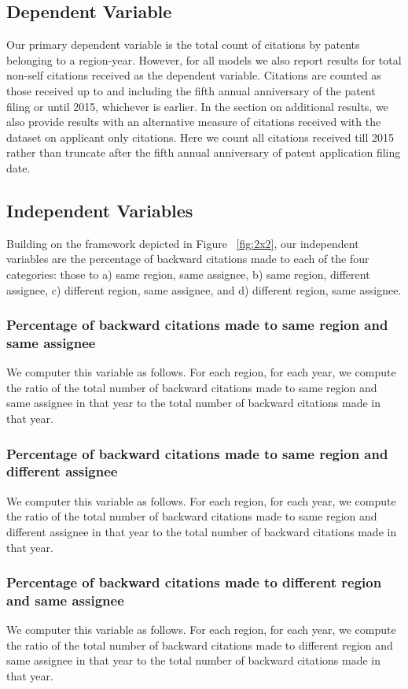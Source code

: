 \documentclass[12pt,letterpaper]{article}
\begin{document}
\subsection{Dependent Variable}
Our primary dependent variable is the  total count of citations by patents belonging to a region-year. However, for all models we also report results for total non-self citations received as the dependent variable. Citations are counted as those received up to and including the fifth annual anniversary of the patent filing or until  2015, whichever is earlier. In the section on additional results, we also provide results with an alternative measure of citations received with the dataset on applicant only citations. Here we count all citations received till 2015 rather than truncate after the fifth annual anniversary of patent application filing date. 

\subsection{Independent Variables}
Building on the framework depicted in Figure ~\ref{fig:2x2}, our independent variables are the percentage of backward citations made to each of the four categories: those to a) same region, same assignee, b) same region, different assignee, c) different region, same assignee, and d) different region, same assignee. \par
\subsubsection{Percentage of backward citations made to same region and same assignee}
We computer this variable as follows. For each region, for each year, we compute the ratio of the total number of backward citations made to same region and same assignee in that year to the total number of backward citations made in that year.
\subsubsection{Percentage of backward citations made to same region and different assignee}
We computer this variable as follows. For each region, for each year, we compute the ratio of the total number of backward citations made to same region and different assignee in that year to the total number of backward citations made in that year.
\subsubsection{Percentage of backward citations made to different region and same assignee}
We computer this variable as follows. For each region, for each year, we compute the ratio of the total number of backward citations made to different region and same assignee in that year to the total number of backward citations made in that year.
\end{document}
